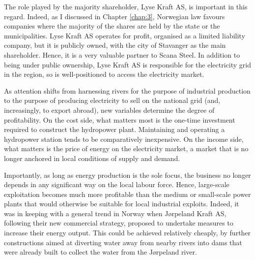 The role played by the majority shareholder, Lyse Kraft AS, is important in this regard. Indeed, as I discussed in Chapter \ref{chap:3}, Norwegian law favours companies where the majority of the shares are held by the state or the municipalities. Lyse Kraft AS operates for profit, organised as a limited liability company, but it is publicly owned, with the city of Stavanger as the main shareholder. Hence, it is a very valuable partner to Scana Steel. In addition to being under public ownership, Lyse Kraft AS is responsible for the electricity grid in the region, so is well-positioned to access the electricity market.


As attention shifts from harnessing rivers for the purpose of industrial production to the purpose of producing electricity to sell on the national grid (and, increasingly, to export abroad), new variables determine the degree of profitability. On the cost side, what matters most is the one-time investment required to construct the hydropower plant. Maintaining and operating a hydropower station tends to be comparatively inexpensive. On the income side, what matters is the price of energy on the electricity market, a market that is no longer anchored in local conditions of supply and demand.

Importantly, as long as energy production is the sole focus, the business no longer depends in any significant way on the local labour force. Hence, large-scale exploitation becomes much more profitable than the medium or small-scale power plants that would otherwise be suitable for local industrial exploits. Indeed, it was in keeping with a general trend in Norway when Jørpeland Kraft AS, following  their new commercial strategy, proposed to undertake measures to increase their energy output. This could be achieved relatively cheaply, by further constructions aimed at diverting water away from nearby rivers into dams that were already built to collect the water from the Jørpeland river.

